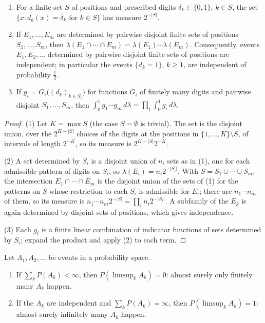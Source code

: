 \begin{lemma}\label{measure-theory:lemma-binary-digits}
\begin{enumerate}
\item For a finite set $S$ of positions and prescribed digits $\delta_k \in \{0, 1\}$, $k \in S$, the set $\{x : d_k(x) = \delta_k \text{ for } k \in S\}$ has measure $2^{-|S|}$.
\item If $E_1, \ldots, E_m$ are determined by pairwise disjoint finite sets of positions $S_1, \ldots, S_m$, then $\lambda(E_1 \cap \cdots \cap E_m) = \lambda(E_1) \cdots \lambda(E_m)$. Consequently, events
$E_1, E_2, \ldots$ determined by pairwise disjoint finite sets of positions are independent; in particular the events $\{d_k = 1\}$, $k \geq 1$, are independent of probability $\frac12$.
\item If $g_i = G_i\bigl((d_k)_{k \in S_i}\bigr)$ for functions $G_i$ of finitely many digits and pairwise disjoint $S_1, \ldots, S_m$, then $\int_0^1g_1 \cdots g_m\,d\lambda = \prod_i\int_0^1g_i\,d\lambda$.
\end{enumerate}
\end{lemma}

\begin{proof}
(1) Let $K = \max S$ (the case $S = \emptyset$ is trivial). The set is the disjoint union, over the $2^{K - |S|}$ choices of the digits at the positions in $\{1, \ldots, K\} \setminus S$, of intervals of length
$2^{-K}$, so its measure is $2^{K - |S|}2^{-K}$.

(2) A set determined by $S_i$ is a disjoint union of $n_i$ sets as in (1), one for each admissible pattern of digits on $S_i$, so $\lambda(E_i) = n_i2^{-|S_i|}$. With $S = S_1 \cup \cdots \cup S_m$, the
intersection $E_1 \cap \cdots \cap E_m$ is the disjoint union of the sets of (1) for the patterns on $S$ whose restriction to each $S_i$ is admissible for $E_i$; there are $n_1 \cdots n_m$ of them, so its
measure is $n_1 \cdots n_m2^{-|S|} = \prod_in_i2^{-|S_i|}$. A subfamily of the $E_k$ is again determined by disjoint sets of positions, which gives independence.

(3) Each $g_i$ is a finite linear combination of indicator functions of sets determined by $S_i$; expand the product and apply (2) to each term.
\end{proof}

\begin{theorem}\label{measure-theory:theorem-borel-cantelli}
Let $A_1, A_2, \ldots$ be events in a probability space.
\begin{enumerate}
\item If $\sum_kP(A_k) < \infty$, then $P(\limsup_kA_k) = 0$: almost surely only finitely many $A_k$ happen.
\item If the $A_k$ are independent and $\sum_kP(A_k) = \infty$, then $P(\limsup_kA_k) = 1$: almost surely infinitely many $A_k$ happen.
\end{enumerate}
\end{theorem}


